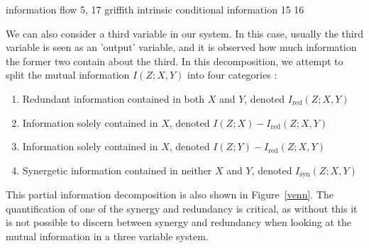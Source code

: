 \documentclass[../main.tex]{subfiles}
\begin{document}

information flow 5, 17
griffith intrinsic conditional information 15 16

We can also consider a third variable in our system.
In this case, usually the third variable is seen as an 'output' variable, and it is observed how much information the former two contain about the third.
In this decomposition, we attempt to split the mutual information $I(Z;X,Y)$ into four categories \cite{williams2010nonnegative}:
%
\begin{enumerate}
\item Redundant information contained in both $X$ and $Y$, denoted $I_\mathrm{red}(Z;X,Y)$
\item Information solely contained in $X$, denoted $I(Z; X) - I_\mathrm{red}(Z;X,Y)$
\item Information solely contained in $X$, denoted $I(Z; Y) - I_\mathrm{red}(Z;X,Y)$
\item Synergetic information contained in neither $X$ and $Y$, denoted $I_\mathrm{syn}(Z;X,Y)$
\end{enumerate}
This partial information decomposition is also shown in Figure~\ref{venn}.
The quantification of one of the synergy and redundancy is critical, as without this it is not possible to discern between synergy and redundancy when looking at the mutual information in a three variable system.

\def\firstcircle{(0:-0.9cm) circle (2cm)}
\def\secondcircle{(0:0cm) circle (3cm)}
\def\thirdcircle{(0:0.9cm) circle (2cm)}
\end{document}
